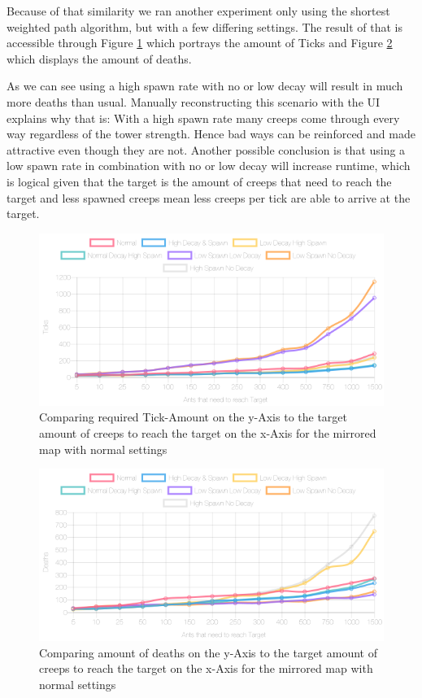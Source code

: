Because of that similarity we ran another experiment only using the shortest weighted path algorithm, but with a few differing settings. The result of that is accessible through Figure \ref{fig:diffsettings} which portrays the amount of Ticks and Figure \ref{fig:diffsettingsdeath} which displays the amount of deaths.

As we can see using a high spawn rate with no or low decay will result in much more deaths than usual. Manually reconstructing this scenario with the UI explains why that is: With a high spawn rate many creeps come through every way regardless of the tower strength. Hence bad ways can be reinforced and made attractive even though they are not.
Another possible conclusion is that using a low spawn rate in combination with no or low decay will increase runtime, which is logical given that the target is the amount of creeps that need to reach the target and less spawned creeps mean less creeps per tick are able to arrive at the target. 

\begin{figure}[H]
  \centering
  \includegraphics[width=1\linewidth]{images/mirroredwithtower-ticks-line}
  \caption{Comparing required Tick-Amount on the y-Axis to the target amount of creeps to reach the target on the x-Axis for the mirrored map with normal settings}
  \label{fig:diffsettings}
\end{figure}

\begin{figure}[H]
  \centering
  \includegraphics[width=1\linewidth]{images/mirroredwithtower-deaths-line}
  \caption{Comparing amount of deaths on the y-Axis to the target amount of creeps to reach the target on the x-Axis for the mirrored map with normal settings}
  \label{fig:diffsettingsdeath}
\end{figure}

